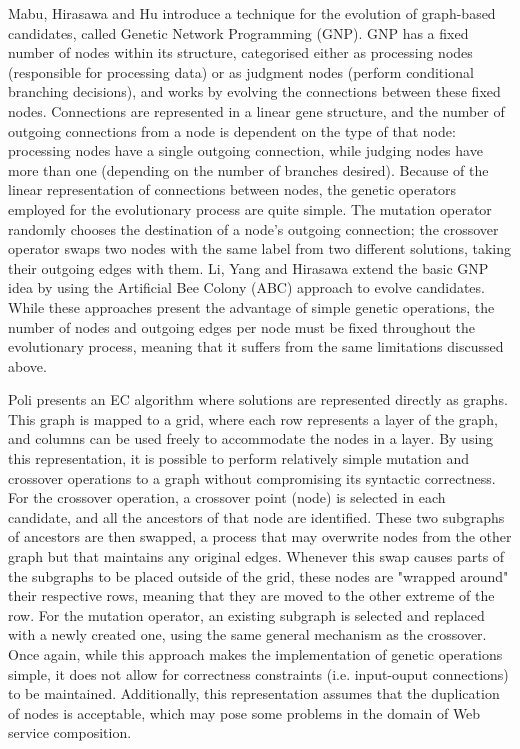 Mabu, Hirasawa and Hu \cite{mabu2007graph} introduce a technique for the evolution of graph-based candidates, called Genetic Network Programming (GNP). GNP has a fixed number of nodes within its structure, categorised either as processing nodes (responsible for processing data) or as judgment nodes (perform conditional branching decisions), and works by evolving the connections between these fixed nodes. Connections are represented in a linear gene structure, and the number of outgoing connections from a node is dependent on the type of that node: processing nodes have a single outgoing connection, while judging nodes have more than one (depending on the number of branches desired). Because of the linear representation of connections between nodes, the genetic operators employed for the evolutionary process are quite simple. The mutation operator randomly chooses the destination of a node's outgoing connection; the crossover operator swaps two nodes with the same label from two different solutions, taking their outgoing edges with them. Li, Yang and Hirasawa \cite{li2014evolving} extend the basic GNP idea by using the Artificial Bee Colony (ABC) approach to evolve candidates. While these approaches present the advantage of simple genetic operations, the number of nodes and outgoing edges per node must be fixed throughout the evolutionary process, meaning that it suffers from the same limitations discussed above.

Poli \cite{poli1996parallel} presents an EC algorithm where solutions are represented directly as graphs. This graph is mapped to a grid, where each row represents a layer of the graph, and columns can be used freely to accommodate the nodes in a layer. By using this representation, it is possible to perform relatively simple mutation and crossover operations to a graph without compromising its syntactic correctness. For the crossover operation, a crossover point (node) is selected in each candidate, and all the ancestors of that node are identified. These two subgraphs of ancestors are then swapped, a process that may overwrite nodes from the other graph but that maintains any original edges. Whenever this swap causes parts of the subgraphs to be placed outside of the grid, these nodes are "wrapped around" their respective rows, meaning that they are moved to the other extreme of the row. For the mutation operator, an existing subgraph is selected and replaced with a newly created one, using the same general mechanism as the crossover. Once again, while this approach makes the implementation of genetic operations simple, it does not allow for correctness constraints (i.e. input-ouput connections) to be maintained. Additionally, this representation assumes that the duplication of nodes is acceptable, which may pose some problems in the domain of Web service composition.


